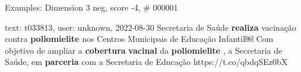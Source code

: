 \begin{frame}{Examples: Dimension 3 neg, score -4, \# 000001}
\footnotesize
\begin{alertblock}{text: t033813, user: unknown, 2022-08-30}
Secretaria de Saúde \textbf{realiza} vacinação contra \textbf{poliomielite} nos 
Centros Municipais de Educação Infantil￼ Com objetivo de ampliar a 
\textbf{cobertura} \textbf{vacinal} da \textbf{poliomielite} , a Secretaria de 
Saúde, em \textbf{parceria} com a Secretaria de Educação 
https://t.co/qbdqSEz0bX 
\end{alertblock}
\end{frame}
